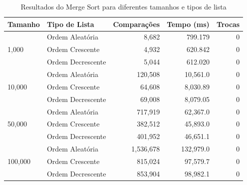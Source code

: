 \documentclass[tcc1,project]{uftex}
\begin{document}
\begin{table}[h]
\centering
\caption{Resultados do Merge Sort para diferentes tamanhos e tipos de lista}
\begin{tabular}{llrrr}
\toprule
\textbf{Tamanho} & \textbf{Tipo de Lista} & \textbf{Comparações} & \textbf{Tempo (ms)} & \textbf{Trocas} \\
\midrule
\multirow{3}{*}{1,000}   & Ordem Aleatória   & 8,682   & 799.179   & 0 \\
                         & Ordem Crescente   & 4,932   & 620.842   & 0 \\
                         & Ordem Decrescente & 5,044   & 612.020   & 0 \\
\midrule
\multirow{3}{*}{10,000}  & Ordem Aleatória   & 120,508 & 10,561.0  & 0 \\
                         & Ordem Crescente   & 64,608  & 8,030.89  & 0 \\
                         & Ordem Decrescente & 69,008  & 8,079.05  & 0 \\
\midrule
\multirow{3}{*}{50,000}  & Ordem Aleatória   & 717,919 & 62,367.0  & 0 \\
                         & Ordem Crescente   & 382,512 & 45,893.0  & 0 \\
                         & Ordem Decrescente & 401,952 & 46,651.1  & 0 \\
\midrule
\multirow{3}{*}{100,000} & Ordem Aleatória   & 1,536,678 & 132,979.0 & 0 \\
                         & Ordem Crescente   & 815,024   & 97,579.7  & 0 \\
                         & Ordem Decrescente & 853,904   & 98,982.1  & 0 \\
\bottomrule
\end{tabular}
\end{table}
\end{document}
